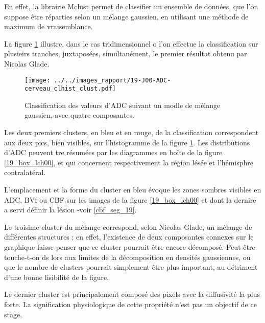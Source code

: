 \par
En effet, la librairie Mclust permet de classifier un ensemble de donn\'ees, que l'on suppose \^etre r\'eparties selon un m\'elange gaussien, %
en utilisant une m\'ethode de maximum de vraisemblance.

\par
La figure \ref{exem_ADC_19} illustre, dans le cas tridimensionnel o l'on effectue la classification sur plusieirs tranches, juxtapos\'ees, simultan\'ement, %
le premier r\'esultat obtenu par Nicolas Glade.

\begin{figure}[H]
\texttt{[image: ../../images\_rapport/19-J00-ADC-cerveau\_clhist\_clust.pdf]}
\caption{Classification des valeurs d'ADC suivant un modle de m\'elange gaussien, avec quatre composantes.
%
}
\label{exem_ADC_19}
\end{figure}

\par
Les deux premiers clusters, en bleu et en rouge, de la classification correspondent aux deux pics, bien visibles, sur l'histogramme de la figure \ref{exem_ADC_19}. %
Les distributions d'ADC peuvent tre r\'esum\'ees par les diagrammes en bo\^ite de la figure \ref{19_box_lch00}, %
et qui concernent respectivement la r\'egion l\'es\'ee et l'h\'emisphre contralat\'eral.

\par
L'emplacement et la forme du cluster en bleu \'evoque les zones sombres visibles en ADC, BVf ou CBF sur les images de la figure \ref{19_box_lch00} %
et dont la dernire a servi  d\'efinir la l\'esion -voir \ref{cbf_seg_19}.

\par
Le troisime cluster du m\'elange correspond, selon Nicolas Glade,  un m\'elange de diff\'erentes structures ; %
en effet, l'existence de deux composantes connexes sur le graphique laisse penser que ce cluster pourrait \^etre encore d\'ecompos\'e. %
Peut-\^etre touche-t-on ds lors aux limites de la d\'ecomposition en densit\'es gaussiennes, ou que le nombre de clusters pourrait simplement \^etre plus important, %
au d\'etriment d'une bonne lisibilit\'e de la figure.

\par
Le dernier cluster est principalement compos\'e des pixels avec la diffusivit\'e la plus forte. %
La signification physiologique de cette propri\'et\'e n'est pas un objectif de ce stage.

